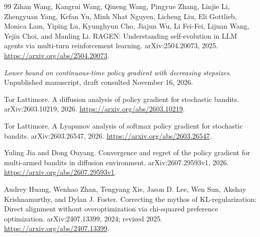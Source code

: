 \documentclass[11pt,twoside]{article}
\theoremstyle{definition}
\theoremstyle{remark}
\begin{document}
\begin{thebibliography}{99}
Zihan Wang, Kangrui Wang, Qineng Wang, Pingyue Zhang, Linjie Li,
Zhengyuan Yang, Kefan Yu, Minh Nhat Nguyen, Licheng Liu, Eli Gottlieb,
Monica Lam, Yiping Lu, Kyunghyun Cho, Jiajun Wu, Li Fei-Fei,
Lijuan Wang, Yejin Choi, and Manling Li.
\newblock RAGEN: Understanding self-evolution in LLM agents via multi-turn
reinforcement learning.
\newblock arXiv:2504.20073, 2025.
\newblock \url{https://arxiv.org/abs/2504.20073}.

\emph{Lower bound on continuous-time policy gradient with decreasing stepsizes}.
\newblock Unpublished manuscript, draft consulted November 16, 2026.

Tor Lattimore.
\newblock A diffusion analysis of policy gradient for stochastic bandits.
\newblock arXiv:2603.10219, 2026.
\newblock \url{https://arxiv.org/abs/2603.10219}.

Tor Lattimore.
\newblock A Lyapunov analysis of softmax policy gradient for stochastic bandits.
\newblock arXiv:2603.26547, 2026.
\newblock \url{https://arxiv.org/abs/2603.26547}.

Yuling Jia and Dong Ouyang.
\newblock Convergence and regret of the policy gradient for multi-armed
bandits in diffusion environment.
\newblock arXiv:2607.29593v1, 2026.
\newblock \url{https://arxiv.org/abs/2607.29593v1}.

Audrey Huang, Wenhao Zhan, Tengyang Xie, Jason D. Lee, Wen Sun,
Akshay Krishnamurthy, and Dylan J. Foster.
\newblock Correcting the mythos of KL-regularization: Direct alignment
without overoptimization via chi-squared preference optimization.
\newblock arXiv:2407.13399, 2024; revised 2025.
\newblock \url{https://arxiv.org/abs/2407.13399}.
\end{thebibliography}
\end{document}
